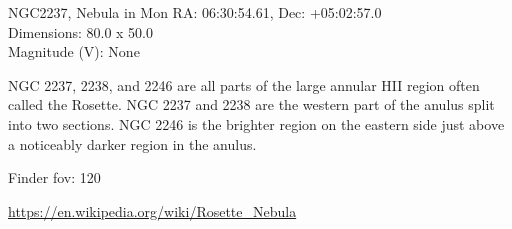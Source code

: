 \begin{block}{NGC2237, Nebula in Mon}
    RA: 06:30:54.61, Dec: +05:02:57.0 \\ 
    Dimensions: 80.0 x 50.0 \\ 
    Magnitude (V): None

    NGC 2237, 2238, and 2246 are all parts of the large annular HII region
    often called the Rosette. NGC 2237 and 2238 are the western part of the
    anulus split into two sections. NGC 2246 is the brighter region on the
    eastern side just above a noticeably darker region in the anulus.


    Finder fov: 120 

    \url{https://en.wikipedia.org/wiki/Rosette_Nebula} 
\end{block}
